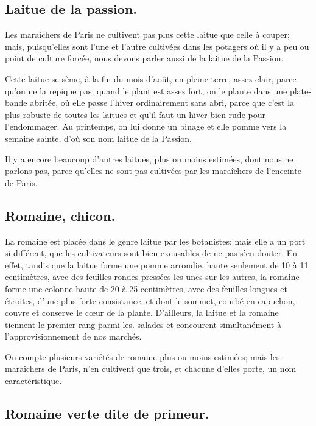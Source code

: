 \documentclass[10pt,a4paper]{book}
\begin{document}
\subsection{Laitue de la passion.}

Les maraîchers de Paris ne cultivent pas plus cette laitue que celle à couper; mais, puisqu'elles sont l'une et l'autre cultivées dans les potagers où il y a peu ou point de culture forcée, nous devons parler aussi de la laitue de la Passion.

Cette laitue se sème, à la fin du mois d'août, en pleine terre, assez clair, parce qu'on ne la repique pas; quand le plant est assez fort, on le plante dans une plate-bande abritée, où elle passe l'hiver ordinairement sans abri, parce que c'est la plus robuste de toutes les laitues et qu'il faut un hiver bien rude pour l'endommager. Au printemps, on lui donne un binage et elle pomme vers la semaine sainte, d'où son nom laitue de la Passion.

Il y a encore beaucoup d'autres laitues, plus ou moins estimées, dont nous ne parlons pas, parce qu'elles ne sont pas cultivées par les maraîchers de l'enceinte de Paris.

\subsection{Romaine, chicon.}

La romaine est placée dans le genre laitue par les botanistes; mais elle a un port si différent, que les cultivateurs sont bien excusables de ne pas s'en douter. En effet, tandis que la laitue forme une pomme arrondie, haute seulement de 10 à 11 centimètres, avec des feuilles rondes pressées les unes sur les autres, la romaine forme une colonne haute de 20 à 25 centimètres, avec des feuilles longues et étroites, d'une plus forte consistance, et dont le sommet, courbé en capuchon, couvre et conserve le cœur de la plante. D'ailleurs, la laitue et la romaine tiennent le premier rang parmi les. salades et concourent simultanément à l'approvisionnement de nos marchés.

On compte plusieurs variétés de romaine plus ou moins estimées; mais les maraîchers de Paris, n'en cultivent que trois, et chacune d'elles porte, un nom caractéristique.

\subsection{Romaine verte dite de primeur.}
\end{document}
